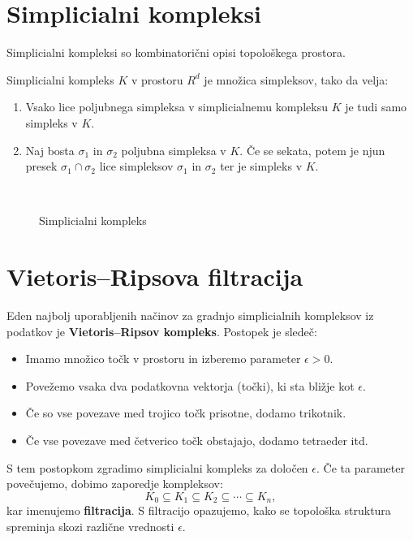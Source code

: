 
\section{Simplicialni kompleksi}
Simplicialni kompleksi so kombinatorični opisi topološkega prostora.
\begin{definicija}
Simplicialni kompleks \(K\) v prostoru \(R^d\) je množica simpleksov, tako da velja:
  \begin{enumerate}
    \item Vsako lice poljubnega simpleksa v simplicialnemu kompleksu \(K\) je tudi samo simpleks v \(K\).
    \item Naj bosta \(\sigma_1\) in \(\sigma_2\) poljubna simpleksa v \(K\). \v{C}e se sekata, potem je njun presek \(\sigma_1 \cap \sigma_2\) lice simpleksov \(\sigma_1\) in \(\sigma_2\) ter je simpleks v \(K\).
  \end{enumerate}
\end{definicija}

\begin{figure}[H]
  \centering
  
  \caption{Simplicialni kompleks}~\label{fig:simplicial-complex}
\end{figure}

\section{Vietoris–Ripsova filtracija}
Eden najbolj uporabljenih načinov za gradnjo simplicialnih kompleksov iz podatkov je \textbf{Vietoris–Ripsov kompleks}. Postopek je sledeč:
\begin{itemize}
  \item Imamo množico točk v prostoru in izberemo parameter $\epsilon > 0$.
  \item Povežemo vsaka dva podatkovna vektorja (točki), ki sta bližje kot $\epsilon$.
  \item Če so vse povezave med trojico točk prisotne, dodamo trikotnik.
  \item Če vse povezave med četverico točk obstajajo, dodamo tetraeder itd.
\end{itemize}

S tem postopkom zgradimo simplicialni kompleks za določen $\epsilon$. Če ta parameter povečujemo, dobimo zaporedje kompleksov:
\[
K_0 \subseteq K_1 \subseteq K_2 \subseteq \cdots \subseteq K_n,
\]
kar imenujemo \textbf{filtracija}. S filtracijo opazujemo, kako se topološka struktura spreminja skozi različne vrednosti $\epsilon$.

